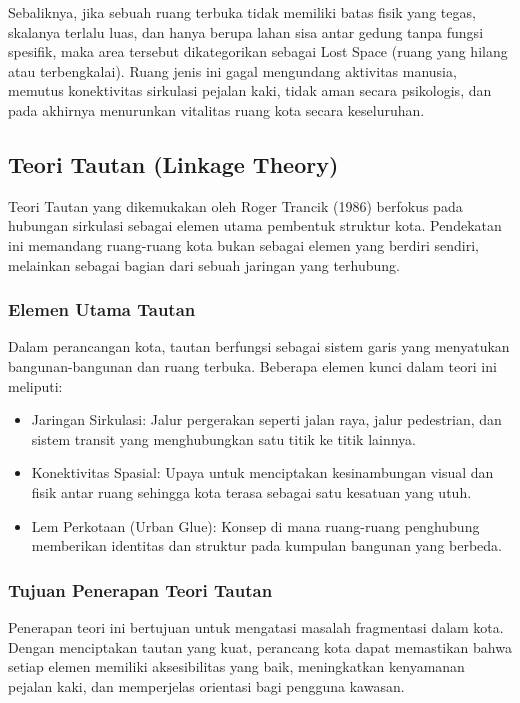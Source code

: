\documentclass[../rumukota.tex]{subfiles}
\begin{document}
Sebaliknya, jika sebuah ruang terbuka tidak memiliki batas fisik yang tegas, skalanya terlalu luas, dan hanya berupa lahan sisa antar gedung tanpa fungsi spesifik, maka area tersebut dikategorikan sebagai Lost Space (ruang yang hilang atau terbengkalai). Ruang jenis ini gagal mengundang aktivitas manusia, memutus konektivitas sirkulasi pejalan kaki, tidak aman secara psikologis, dan pada akhirnya menurunkan vitalitas ruang kota secara keseluruhan.

\subsection{Teori Tautan (Linkage Theory)}
Teori Tautan yang dikemukakan oleh Roger Trancik (1986) berfokus pada hubungan sirkulasi sebagai elemen utama pembentuk struktur kota. Pendekatan ini memandang ruang-ruang kota bukan sebagai elemen yang berdiri sendiri, melainkan sebagai bagian dari sebuah jaringan yang terhubung.

\subsubsection{Elemen Utama Tautan}
Dalam perancangan kota, tautan berfungsi sebagai sistem garis yang menyatukan bangunan-bangunan dan ruang terbuka. Beberapa elemen kunci dalam teori ini meliputi:

\begin{itemize}
	\item Jaringan Sirkulasi: Jalur pergerakan seperti jalan raya, jalur pedestrian, dan sistem transit yang menghubungkan satu titik ke titik lainnya.
	\item Konektivitas Spasial: Upaya untuk menciptakan kesinambungan visual dan fisik antar ruang sehingga kota terasa sebagai satu kesatuan yang utuh.
	\item Lem Perkotaan (Urban Glue): Konsep di mana ruang-ruang penghubung memberikan identitas dan struktur pada kumpulan bangunan yang berbeda.
\end{itemize}

\subsubsection{Tujuan Penerapan Teori Tautan}
Penerapan teori ini bertujuan untuk mengatasi masalah fragmentasi dalam kota. Dengan menciptakan tautan yang kuat, perancang kota dapat memastikan bahwa setiap elemen memiliki aksesibilitas yang baik, meningkatkan kenyamanan pejalan kaki, dan memperjelas orientasi bagi pengguna kawasan.
\end{document}
